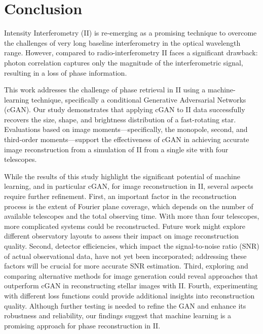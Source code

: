 \section{Conclusion}

Intensity Interferometry (II) is re-emerging as a promising technique to overcome the challenges of very long baseline interferometry in the optical wavelength range.  However, compared to radio-interferometry II faces a significant drawback: photon correlation captures only the magnitude of the interferometric signal, resulting in a loss of phase information.

This work addresses the challenge of phase retrieval in II using a machine-learning technique, specifically a conditional Generative Adversarial Networks (cGAN). Our study demonstrates that applying cGAN to II data successfully recovers the size, shape, and brightness distribution of a fast-rotating star. Evaluations based on image moments—specifically, the monopole, second, and third-order moments—support the effectiveness of cGAN in achieving accurate image reconstruction from a simulation of II from a single site with four telescopes.  

While the results of this study highlight the significant potential of machine learning, and in particular cGAN, for image reconstruction in II, several aspects require further refinement. First, an important factor in the reconstruction process is the extent of Fourier plane coverage, which depends on the number of available telescopes and the total observing time. With more than four telescopes, more complicated systems could be reconstructed. Future work might explore different observatory layouts to assess their impact on image reconstruction quality.  Second, detector efficiencies, which impact the signal-to-noise ratio (SNR) of actual observational data, have not yet been incorporated; addressing these factors will be crucial for more accurate SNR estimation.  Third, exploring and comparing alternative methods for image generation could reveal approaches that outperform cGAN in reconstructing stellar images with II. Fourth, experimenting with different loss functions could provide additional insights into reconstruction quality. Although further testing is needed to refine the GAN and enhance its robustness and reliability, our findings suggest that machine learning is a promising approach for phase reconstruction in II.
